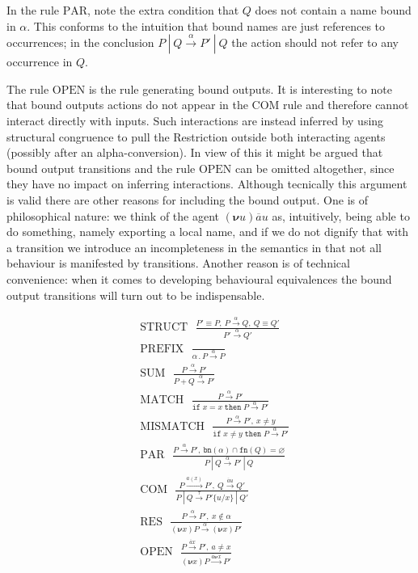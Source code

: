 \documentclass[10pt,a4paper]{article}
\newcommand{\ifthen}[2]{\texttt{if}\;#1\;\texttt{then}\;#2}
\newcommand{\resp}[1]{(\boldsymbol{\nu}#1)}
\newcommand{\res}[2]{\resp{#1}#2}
\newcommand{\outp}[2]{\overline{#1}#2}
\newcommand{\inpp}[2]{#1(#2)}
\newcommand{\silp}{\tau}
\newcommand{\prefix}[2]{{#1}\,.\,#2}
\newcommand{\boutp}[2]{\overline{#1}\boldsymbol{\nu}#2}
\newcommand{\para}{\:|\:}
\newcommand{\fn}{\texttt{fn}}
\newcommand{\bn}{\texttt{bn}}
\newcommand{\tran}[3]{#1 \overset{#2}{\longrightarrow} #3}
\newcommand{\rulname}[1]{\scriptstyle \text{#1}}
\newcommand{\rul}[3]{\rulname{#1} \:\:\: \displaystyle \frac{#2}{#3}}
\begin{document}
In the rule $\rulname{PAR}$, note the extra condition that $Q$ does not contain a name bound in $\alpha$. This conforms to the intuition that bound names are just references to occurrences; in the conclusion $\tran{P \para Q}{\alpha}{P' \para Q}$ the action should not refer to any occurrence in $Q$. 

The rule $\rulname{OPEN}$ is the rule generating bound outputs. It is interesting to note that bound outputs actions do not appear in the $\rulname{COM}$ rule and therefore cannot interact directly with inputs. Such interactions are instead inferred by using structural congruence to pull the Restriction outside both interacting agents (possibly after an alpha-conversion). In view of this it might be argued that bound output transitions and the rule $\rulname{OPEN}$ can be omitted altogether, since they have no impact on inferring interactions. Although tecnically this argument is valid there are other reasons for including the bound output. One is of philosophical nature: we think of the agent $\res{u}{\outp{a}{u}}$ as, intuitively, being able to do something, namely exporting a local name, and if we do not dignify that with a transition we introduce an incompleteness in the semantics in that not all behaviour is manifested by transitions. Another reason is of technical convenience: when it comes to developing behavioural equivalences the bound output transitions will turn out to be indispensable.

\begin{framed}
  \begin{align*}
    &\rul{STRUCT}{P' \equiv P, \: \tran{P}{\alpha}{Q}, \: Q \equiv Q'}{\tran{P'}{\alpha}{Q'}} \\[2.0ex]
    &\rul{PREFIX}{}{\tran{\prefix{\alpha}{P}}{\alpha}{P}} \\[2.0ex]
    &\rul{SUM}{\tran{P}{\alpha}{P'}}{\tran{P + Q}{\alpha}{P'}} \\[2.0ex]
    &\rul{MATCH}{\tran{P}{\alpha}{P'}}{\tran{\ifthen{x = x}{P}}{\alpha}{P'}} \\[2.0ex]
    &\rul{MISMATCH}{\tran{P}{\alpha}{P'}, \: x \neq y}{\tran{\ifthen{x \neq y}{P}}{\alpha}{P'}} \\[2.0ex]
    &\rul{PAR}{\tran{P}{\alpha}{P'}, \: \bn(\alpha) \cap \fn(Q) = \varnothing}{\tran{P \para Q}{\alpha}{P' \para Q}} \\[2.0ex]
    &\rul{COM}{\tran{P}{\inpp{a}{x}}{P'}, \: \tran{Q}{\outp{a}{u}}{Q'}}{\tran{P \para Q}{\silp}{P'\{u/x\} \para Q'}} \\[2.0ex]
    &\rul{RES}{\tran{P}{\alpha}{P'}, \: x \notin \alpha}{\tran{\res{x}{P}}{\alpha}{\res{x}{P'}}} \\[2.0ex]
    &\rul{OPEN}{\tran{P}{\outp{a}{x}}{P'}, \: a \neq x}{\tran{\res{x}{P}}{\boutp{a}{x}}{P'}}
  \end{align*}
\end{framed}
\end{document}
